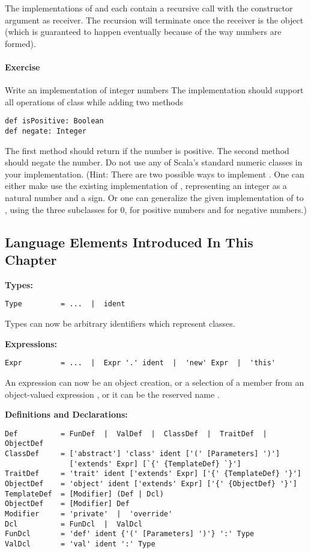 \documentclass[a4paper,12pt,twoside,titlepage]{book}
\newcommand{\exercise}{\paragraph{Exercise}}
\begin{document}
The implementations of \code{+} and \code{-} each contain a recursive
call with the constructor argument as receiver. The recursion will
terminate once the receiver is the  object (which is
guaranteed to happen eventually because of the way numbers are formed).

\exercise Write an implementation  of integer numbers
The implementation should support all operations of class 
while adding two methods
\begin{lstlisting}
def isPositive: Boolean
def negate: Integer
\end{lstlisting}
The first method should return  if the number is positive. The second method should negate the number.
Do not use any of Scala's standard numeric classes in your
implementation. (Hint: There are two possible ways to implement
. One can either make use the existing implementation of
, representing an integer as a natural number and a sign.
Or one can generalize the given implementation of  to
, using the three subclasses  for 0, 
 for positive numbers and  for negative numbers.)



\subsection*{Language Elements Introduced In This Chapter}

\textbf{Types:}
\begin{lstlisting}
Type         = ...  |  ident
\end{lstlisting}

Types can now be arbitrary identifiers which represent classes.

\textbf{Expressions:}
\begin{lstlisting}
Expr         = ...  |  Expr '.' ident  |  'new' Expr  |  'this'
\end{lstlisting}

An expression can now be an object creation, or
a selection  of a member 
from an object-valued expression , or it can be the reserved name .

\textbf{Definitions and Declarations:}
\begin{lstlisting}
Def          = FunDef  |  ValDef  |  ClassDef  |  TraitDef  |  ObjectDef
ClassDef     = ['abstract'] 'class' ident ['(' [Parameters] ')'] 
               ['extends' Expr] [`{' {TemplateDef} `}']
TraitDef     = 'trait' ident ['extends' Expr] ['{' {TemplateDef} '}']
ObjectDef    = 'object' ident ['extends' Expr] ['{' {ObjectDef} '}']
TemplateDef  = [Modifier] (Def | Dcl)
ObjectDef    = [Modifier] Def
Modifier     = 'private'  |  'override'
Dcl          = FunDcl  |  ValDcl
FunDcl       = 'def' ident {'(' [Parameters] ')'} ':' Type
ValDcl       = 'val' ident ':' Type
\end{lstlisting}
\end{document}
